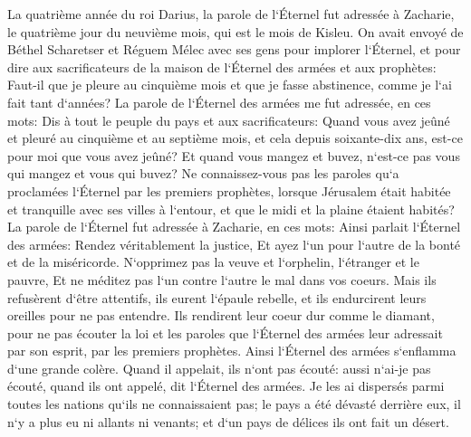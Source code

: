 \verse La quatrième année du roi Darius, la parole de l`Éternel fut adressée à Zacharie, le quatrième jour du neuvième mois, qui est le mois de Kisleu. 
\verse On avait envoyé de Béthel Scharetser et Réguem Mélec avec ses gens pour implorer l`Éternel, 
\verse et pour dire aux sacrificateurs de la maison de l`Éternel des armées et aux prophètes: Faut-il que je pleure au cinquième mois et que je fasse abstinence, comme je l`ai fait tant d`années? 
\verse La parole de l`Éternel des armées me fut adressée, en ces mots: 
\verse Dis à tout le peuple du pays et aux sacrificateurs: Quand vous avez jeûné et pleuré au cinquième et au septième mois, et cela depuis soixante-dix ans, est-ce pour moi que vous avez jeûné? 
\verse Et quand vous mangez et buvez, n`est-ce pas vous qui mangez et vous qui buvez? 
\verse Ne connaissez-vous pas les paroles qu`a proclamées l`Éternel par les premiers prophètes, lorsque Jérusalem était habitée et tranquille avec ses villes à l`entour, et que le midi et la plaine étaient habités? 
\verse La parole de l`Éternel fut adressée à Zacharie, en ces mots: 
\verse Ainsi parlait l`Éternel des armées: Rendez véritablement la justice, Et ayez l`un pour l`autre de la bonté et de la miséricorde. 
\verse N`opprimez pas la veuve et l`orphelin, l`étranger et le pauvre, Et ne méditez pas l`un contre l`autre le mal dans vos coeurs. 
\verse Mais ils refusèrent d`être attentifs, ils eurent l`épaule rebelle, et ils endurcirent leurs oreilles pour ne pas entendre. 
\verse Ils rendirent leur coeur dur comme le diamant, pour ne pas écouter la loi et les paroles que l`Éternel des armées leur adressait par son esprit, par les premiers prophètes. Ainsi l`Éternel des armées s`enflamma d`une grande colère. 
\verse Quand il appelait, ils n`ont pas écouté: aussi n`ai-je pas écouté, quand ils ont appelé, dit l`Éternel des armées. 
\verse Je les ai dispersés parmi toutes les nations qu`ils ne connaissaient pas; le pays a été dévasté derrière eux, il n`y a plus eu ni allants ni venants; et d`un pays de délices ils ont fait un désert. 

\chapter{}

